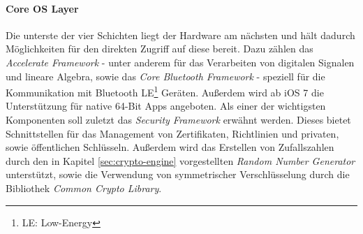 		\paragraph{Core OS Layer}\label{sec:ios-coreoslayer}
			Die unterste der vier Schichten liegt der Hardware am nächsten und
			hält dadurch Möglichkeiten für den direkten Zugriff auf diese bereit. Dazu
			zählen das \textsl{Accelerate Framework} - unter anderem für das Verarbeiten
			von digitalen Signalen und lineare Algebra, sowie das \textsl{Core Bluetooth
			Framework} - speziell für die Kommunikation mit Bluetooth LE\footnote{LE: Low-Energy} Geräten.
			Außerdem wird ab iOS 7 die Unterstützung für native 64-Bit Apps angeboten.
			Als einer der wichtigsten Komponenten soll zuletzt das \textsl{Security
			Framework} erwähnt werden.
			Dieses bietet Schnittstellen für das Management von Zertifikaten, Richtlinien
			und privaten, sowie öffentlichen Schlüsseln. Außerdem wird das Erstellen von
			Zufallszahlen durch den in Kapitel \ref{sec:crypto-engine}
			vorgestellten \textsl{Random Number Generator} unterstützt, sowie die
			Verwendung von symmetrischer Verschlüsselung durch die Bibliothek
			\textsl{Common Crypto Library}.
